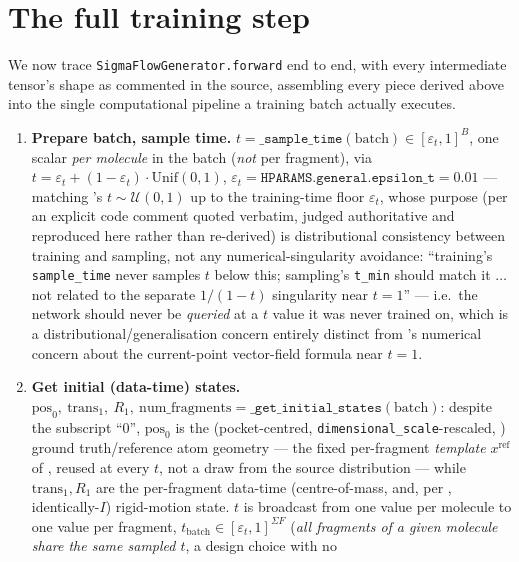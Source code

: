 \documentclass[11pt,a4paper]{report}
\theoremstyle{definition}
\theoremstyle{remark}
\newcommand{\eps}{\varepsilon}
\newcommand{\pyfunc}[1]{\texttt{#1}}
\begin{document}
\section{The full training step}
\label{sec:sigmaflow-training-pipeline}

We now trace \pyfunc{SigmaFlowGenerator.forward} end to end, with every
intermediate tensor's shape as commented in the source, assembling every
piece derived above into the single computational pipeline a training
batch actually executes.

\begin{enumerate}
\item \textbf{Prepare batch, sample time.}
$t=\pyfunc{\_sample\_time}(\mathrm{batch})\in[\eps_t,1]^B$, one scalar
\emph{per molecule} in the batch (\emph{not} per fragment), via
$t=\eps_t+(1-\eps_t)\cdot\mathrm{Unif}(0,1)$, $\eps_t=\texttt{HPARAMS.general.epsilon\_t}=0.01$
--- matching 's $t\sim\mathcal U(0,1)$ up to the
training-time floor $\eps_t$, whose purpose (per an explicit code comment
quoted verbatim, judged authoritative and reproduced here rather than
re-derived) is distributional consistency between training and sampling,
not any numerical-singularity avoidance: ``training's \texttt{sample\_time}
never samples $t$ below this; sampling's \texttt{t\_min} should match it
$\dots$ not related to the separate $1/(1-t)$ singularity near $t=1$'' ---
i.e.\ the network should never be \emph{queried} at a $t$ value it was
never trained on, which is a distributional/generalisation concern
entirely distinct from 's numerical
concern about the current-point vector-field formula near $t=1$.
\item \textbf{Get initial (data-time) states.}
$\mathrm{pos}_0,\ \mathrm{trans}_1,\ R_1,\ \mathrm{num\_fragments}
= \pyfunc{\_get\_initial\_states}(\mathrm{batch})$: despite the
subscript ``$0$'', $\mathrm{pos}_0$ is the (pocket-centred,
\texttt{dimensional\_scale}-rescaled, ) ground
truth/reference atom geometry --- the fixed per-fragment \emph{template}
$x^{\mathrm{ref}}$ of , reused at every
$t$, not a draw from the source distribution --- while $\mathrm{trans}_1,R_1$
are the per-fragment data-time (centre-of-mass, and, per
, identically-$I$) rigid-motion state.
$t$ is broadcast from one value per molecule to one value per fragment,
$t_{\mathrm{batch}}\in[\eps_t,1]^{\Sigma F}$ (\emph{all fragments of a
given molecule share the same sampled $t$}, a design choice with no

\end{enumerate}
\end{document}
